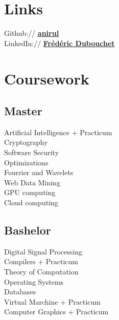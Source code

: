 \documentclass[a4paper]{deedy-resume} %
\begin{document}
\begin{minipage}[t]{0.33\textwidth}
\sectionspace %


\section{Links}

Github:// \href{https://github.com/anirul}
	{\bf anirul} \\
LinkedIn:// \href{https://www.linkedin.com/in/fr\%C3\%A9d\%C3\%A9ric-dubouchet-b885621/}
	{\bf Frédéric Dubouchet} \\

\sectionspace %


\section{Coursework}

\subsection{Master}
	Artificial Intelligence + Practicum \\
	Cryptography \\
	Software Security \\
	Optimizations \\
	Fourrier and Wavelets \\
	Web Data Mining \\
	GPU computing \\
	Cloud computing \\

\sectionspace %


\subsection{Bashelor}
	Digital Signal Processing \\
	Compilers + Practicum \\
	Theory of Computation \\
	Operating Systems \\
	Databases \\
	Virtual Marchine + Practicum \\
	Computer Graphics + Practicum \\

\sectionspace %


\end{minipage}%
\end{document}
